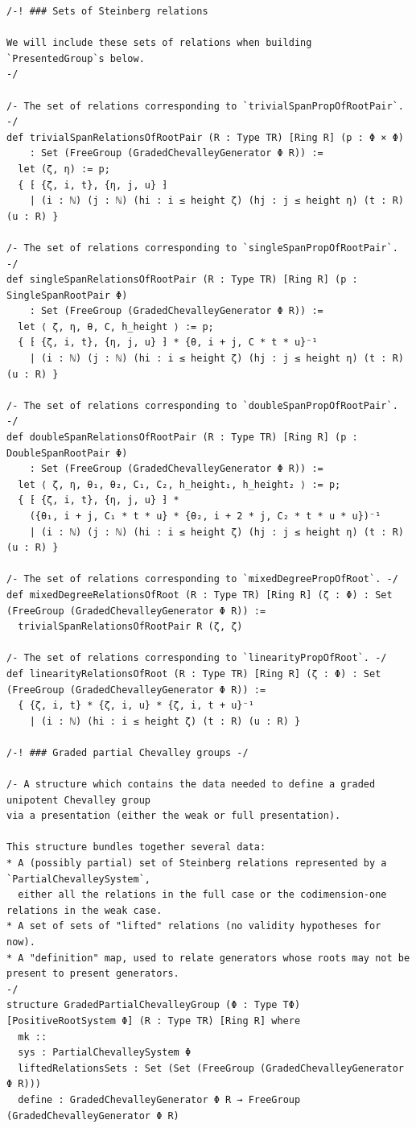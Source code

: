 \documentclass[10pt,a4paper]{article}
\begin{document}
\begin{Verbatim}
/-! ### Sets of Steinberg relations

We will include these sets of relations when building `PresentedGroup`s below.
-/

/- The set of relations corresponding to `trivialSpanPropOfRootPair`. -/
def trivialSpanRelationsOfRootPair (R : Type TR) [Ring R] (p : Φ × Φ)
    : Set (FreeGroup (GradedChevalleyGenerator Φ R)) :=
  let (ζ, η) := p;
  { ⁅ {ζ, i, t}, {η, j, u} ⁆
    | (i : ℕ) (j : ℕ) (hi : i ≤ height ζ) (hj : j ≤ height η) (t : R) (u : R) }

/- The set of relations corresponding to `singleSpanPropOfRootPair`. -/
def singleSpanRelationsOfRootPair (R : Type TR) [Ring R] (p : SingleSpanRootPair Φ)
    : Set (FreeGroup (GradedChevalleyGenerator Φ R)) :=
  let ⟨ ζ, η, θ, C, h_height ⟩ := p;
  { ⁅ {ζ, i, t}, {η, j, u} ⁆ * {θ, i + j, C * t * u}⁻¹
    | (i : ℕ) (j : ℕ) (hi : i ≤ height ζ) (hj : j ≤ height η) (t : R) (u : R) }

/- The set of relations corresponding to `doubleSpanPropOfRootPair`. -/
def doubleSpanRelationsOfRootPair (R : Type TR) [Ring R] (p : DoubleSpanRootPair Φ)
    : Set (FreeGroup (GradedChevalleyGenerator Φ R)) :=
  let ⟨ ζ, η, θ₁, θ₂, C₁, C₂, h_height₁, h_height₂ ⟩ := p;
  { ⁅ {ζ, i, t}, {η, j, u} ⁆ *
    ({θ₁, i + j, C₁ * t * u} * {θ₂, i + 2 * j, C₂ * t * u * u})⁻¹
    | (i : ℕ) (j : ℕ) (hi : i ≤ height ζ) (hj : j ≤ height η) (t : R) (u : R) }

/- The set of relations corresponding to `mixedDegreePropOfRoot`. -/
def mixedDegreeRelationsOfRoot (R : Type TR) [Ring R] (ζ : Φ) : Set (FreeGroup (GradedChevalleyGenerator Φ R)) :=
  trivialSpanRelationsOfRootPair R (ζ, ζ)

/- The set of relations corresponding to `linearityPropOfRoot`. -/
def linearityRelationsOfRoot (R : Type TR) [Ring R] (ζ : Φ) : Set (FreeGroup (GradedChevalleyGenerator Φ R)) :=
  { {ζ, i, t} * {ζ, i, u} * {ζ, i, t + u}⁻¹
    | (i : ℕ) (hi : i ≤ height ζ) (t : R) (u : R) }

/-! ### Graded partial Chevalley groups -/

/- A structure which contains the data needed to define a graded unipotent Chevalley group
via a presentation (either the weak or full presentation).

This structure bundles together several data:
* A (possibly partial) set of Steinberg relations represented by a `PartialChevalleySystem`,
  either all the relations in the full case or the codimension-one relations in the weak case.
* A set of sets of "lifted" relations (no validity hypotheses for now).
* A "definition" map, used to relate generators whose roots may not be present to present generators.
-/
structure GradedPartialChevalleyGroup (Φ : Type TΦ) [PositiveRootSystem Φ] (R : Type TR) [Ring R] where
  mk ::
  sys : PartialChevalleySystem Φ
  liftedRelationsSets : Set (Set (FreeGroup (GradedChevalleyGenerator Φ R)))
  define : GradedChevalleyGenerator Φ R → FreeGroup (GradedChevalleyGenerator Φ R)


\end{Verbatim}
\end{document}
